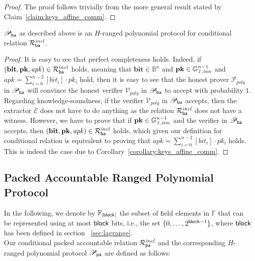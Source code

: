 \begin{proof}The proof follows trivially from the more general result stated by Claim~\ref{claim:keys_affine_comm}. 
\end{proof}

\begin{lemma} 
$\mathscr{P}_{\mathsf{ba}}$ as described above is an $H$-ranged polynomial 
protocol for conditional relation $\mathcal{R}^{\mathit{incl}}_{\mathsf{ba}}$.
\end{lemma}

\begin{proof}
It is easy to see that perfect completeness holds. Indeed, if $(\mathbf{bit},\mathbf{pk}, \mathit{apk}) \in \mathcal{R}^{\mathit{incl}}_{\mathsf{ba}}$ holds, 
meaning that $\mathbf{bit} \in \mathbb{B}^n$ and $\mathbf{pk} \in \mathbb{G}_{\mathit{1,inn}}^{n-1}$ and $\mathit{apk} = \sum_{i=0}^{n-2} [\mathit{bit_i}] \cdot \mathit{pk_i}$ hold, 
then it is easy to see that the honest prover $\mathcal{P}_{poly}$ in $\mathscr{P}_{\mathsf{ba}}$ will convince the honest verifier $\mathcal{V}_{poly}$ in 
$\mathscr{P}_{\mathsf{ba}}$ to accept with probability $1$. \\
Regarding knowledge-soundness, if the verifier $\mathcal{V}_{poly}$ in $\mathscr{P}_{\mathsf{ba}}$ accepts, 
then the extractor $\mathcal{E}$ does not have to do anything as the relation $\mathcal{R}^{\mathit{incl}}_{\mathsf{ba}}$ does not have a witness.  
However, we have to prove that if $\mathbf{pk} \in \mathbb{G}_{\mathit{1,inn}}^{n-1}$ and the verifier in $\mathscr{P}_{\mathsf{ba}}$ accepts, 
then $(\mathbf{bit},\mathbf{pk}, \mathit{apk}) \in \mathcal{R}^{\mathit{incl}}_{\mathsf{ba}}$ holds, which given our definition for conditional relation is 
equivalent to proving that $\mathit{apk} = \sum_{i=0}^{n-2} [\mathit{bit_i}] \cdot \mathit{pk_i}$ holds. This is indeed the case due to 
Corollary~\ref{corollary:keys_affine_comm}.

\end{proof}

\subsection{Packed Accountable Ranged Polynomial Protocol}
\label{sec_a}
In the following, we denote by $\mathbb{F}_{|\mathsf{block}|}$ the subset of field elements in $\mathbb{F}$ that can be represented using at most $\mathsf{block}$ bits, i.e., the set $\{0, \ldots, 2^{\mathsf{block} -1} \}$, 
where $\mathsf{block}$ has been defined in section ~\ref{sec:lagrange}. \\
\noindent Our conditional packed accountable relation $\mathcal{R}^{\mathit{incl}}_{\mathsf{pa}}$ and the corresponding $H$-ranged polynomial protocol 
$\mathscr{P}_{\mathsf{pa}}$ are defined as follows:\\
 
